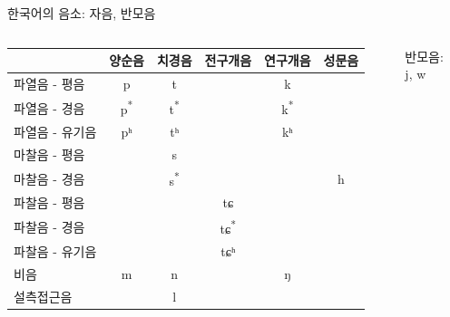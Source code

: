 \documentclass[11pt, aspectratio=169]{beamer}
\newcommand{\textds}[1]{{\ipafont #1}}
\begin{document}
\begin{frame}[t]{{한국어의 음소: 자음, 반모음}}
    \begin{columns}
        \begin{column}[T]{0.8\textwidth}
            \begin{tabular}{lccccc}
                \hline
                    & \textbf{양순음} & \textbf{치경음} & \textbf{전구개음} & \textbf{연구개음} & \textbf{성문음} \\
                \hline
                파열음 - 평음  & \textds{p} & \textds{t} & & \textds{k} & \\
                \hline
                파열음 - 경음 & \textds{p\textsuperscript{*}} & \textds{t\textsuperscript{*}} & & \textds{k\textsuperscript{*}} & \\
                \hline
                파열음 - 유기음 & \textds{pʰ} & \textds{tʰ} & & \textds{kʰ} & \\
                \hline
                마찰음 - 평음 & & \textds{s} & & & \\
                \hline
                마찰음 - 경음 & & \textds{s\textsuperscript{*}} & & & \textds{h} \\
                \hline
                파찰음 - 평음  & & & \textds{tɕ} & & \\
                \hline
                파찰음 - 경음  & & & \textds{tɕ\textsuperscript{*}} & & \\
                \hline
                파찰음 - 유기음  & & & \textds{tɕʰ} & & \\
                \hline
                비음  & \textds{m} & \textds{n} & & \textds{ŋ} & \\
                \hline
                설측접근음  &  & \textds{l} & & & \\            
                \hline
            \end{tabular}            
        \end{column}
        \begin{column}[T]{0.13\textwidth}
            반모음: \\ j, w            
        \end{column}
    \end{columns}

\end{frame}
\end{document}
